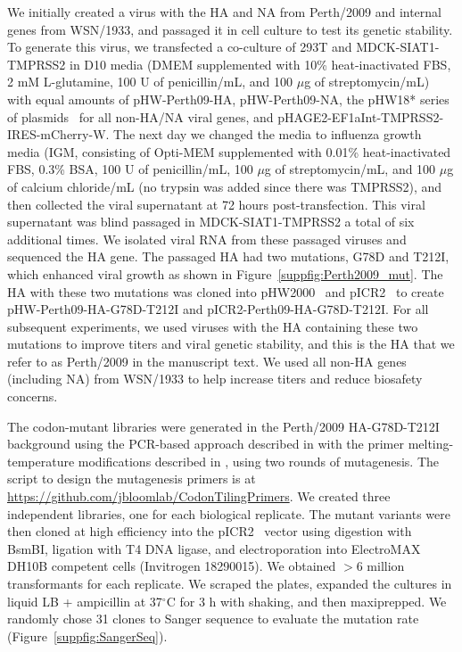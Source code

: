 \documentclass[9pt,twocolumn,twoside]{pnas-new-for-biorxiv}
\begin{document}
{We initially created a virus with the HA and NA from Perth/2009 and internal genes from WSN/1933, and passaged it in cell culture to test its genetic stability.
To generate this virus, we transfected a co-culture of 293T and MDCK-SIAT1-TMPRSS2 in D10 media (DMEM supplemented with 10\% heat-inactivated FBS, 2 mM L-glutamine, 100 U of penicillin/mL, and 100 $\mu$g of streptomycin/mL) with equal amounts of pHW-Perth09-HA, pHW-Perth09-NA, the pHW18* series of plasmids~\cite{hoffmann2000dna} for all non-HA/NA viral genes, and pHAGE2-EF1aInt-TMPRSS2-IRES-mCherry-W.
The next day we changed the media to influenza growth media (IGM, consisting of Opti-MEM supplemented with 0.01\% heat-inactivated FBS, 0.3\% BSA, 100 U of penicillin/mL, 100 $\mu$g of streptomycin/mL, and 100 $\mu$g of calcium chloride/mL (no trypsin was added since there was TMPRSS2), and then collected the viral supernatant at 72 hours post-transfection.
This viral supernatant was blind passaged in MDCK-SIAT1-TMPRSS2 a total of six additional times.
We isolated viral RNA from these passaged viruses and sequenced the HA gene.
The passaged HA had two mutations, G78D and T212I, which enhanced viral growth as shown in Figure~\ref{suppfig:Perth2009_mut}.
The HA with these two mutations was cloned into pHW2000~\citep{hoffmann2000dna} and pICR2~\cite{ashenberg2017deep} to create pHW-Perth09-HA-G78D-T212I and pICR2-Perth09-HA-G78D-T212I.
For all subsequent experiments, we used viruses with the HA containing these two mutations to improve titers and viral genetic stability, and this is the HA that we refer to as Perth/2009 in the manuscript text.
We used all non-HA genes (including NA) from WSN/1933 to help increase titers and reduce biosafety concerns.

The codon-mutant libraries were generated in the Perth/2009 HA-G78D-T212I background using the PCR-based approach described in \cite{bloom2014experimentally} with the primer melting-temperature modifications described in \cite{dingens2017comprehensive}, using two rounds of mutagenesis.
The script to design the mutagenesis primers is at \url{https://github.com/jbloomlab/CodonTilingPrimers}.
We created three independent libraries, one for each biological replicate.
The mutant variants were then cloned at high efficiency into the pICR2~\cite{ashenberg2017deep} vector using digestion with BsmBI, ligation with T4 DNA ligase, and electroporation into ElectroMAX DH10B competent cells (Invitrogen 18290015).
We obtained $>$6 million transformants for each replicate.
We scraped the plates, expanded the cultures in liquid LB + ampicillin at 37$^{\circ}$C for 3 h with shaking, and then maxiprepped.
We randomly chose 31 clones to Sanger sequence to evaluate the mutation rate (Figure~\ref{suppfig:SangerSeq}).

}
\end{document}

